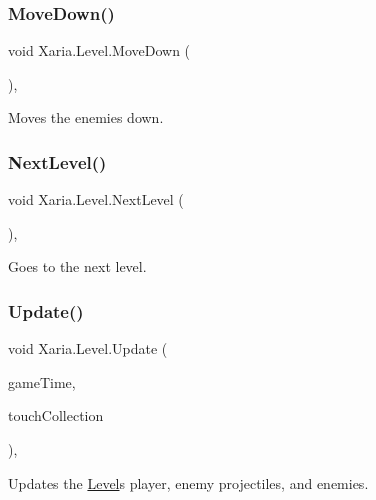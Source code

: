 \subsubsection{\texorpdfstring{Move\+Down()}{MoveDown()}}
{\footnotesize\ttfamily void Xaria.\+Level.\+Move\+Down (\begin{DoxyParamCaption}{ }\end{DoxyParamCaption})\hspace{0.3cm}{\ttfamily [inline]}, {\ttfamily [private]}}



Moves the enemies down. 

\mbox{\label{classXaria_1_1Level_ab1b45e8eacae455500518158aceadeba}} 
\subsubsection{\texorpdfstring{Next\+Level()}{NextLevel()}}
{\footnotesize\ttfamily void Xaria.\+Level.\+Next\+Level (\begin{DoxyParamCaption}{ }\end{DoxyParamCaption})\hspace{0.3cm}{\ttfamily [inline]}, {\ttfamily [private]}}



Goes to the next level. 

\mbox{\label{classXaria_1_1Level_a0591034ea9fd9f955a4bf7ceb698c2a4}} 
\subsubsection{\texorpdfstring{Update()}{Update()}}
{\footnotesize\ttfamily void Xaria.\+Level.\+Update (\begin{DoxyParamCaption}\item[{Game\+Time}]{game\+Time,  }\item[{Touch\+Collection}]{touch\+Collection }\end{DoxyParamCaption})\hspace{0.3cm}{\ttfamily [inline]}, {\ttfamily [package]}}



Updates the \hyperlink{classXaria_1_1Level}{Level}\textquotesingle{}s player, enemy projectiles, and enemies. 



